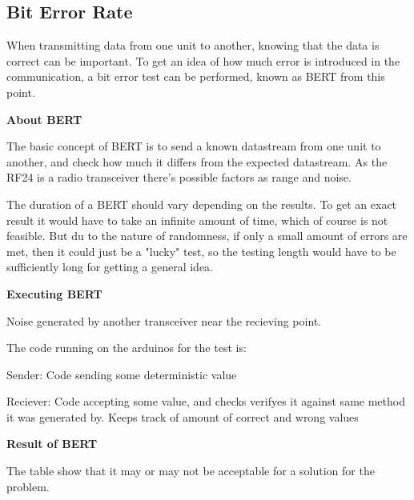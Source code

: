 \subsection{Bit Error Rate}
When transmitting data from one unit to another, knowing that the data is correct can be important. To get an idea of how much error is introduced in the communication, a bit error test can be performed, known as BERT from this point.

\textbf{About BERT}

The basic concept of BERT is to send a known datastream from one unit to another, and check how much it differs from the expected datastream. As the RF24 is a radio transceiver there's possible factors as range and noise. 

The duration of a BERT should vary depending on the results. To get an exact result it would have to take an infinite amount of time, which of course is not feasible. But du to the nature of randomness, if only a small amount of errors are met, then it could just be a "lucky"  test, so the testing length would have to be sufficiently long for getting a general idea.

\textbf{Executing BERT} 

Noise generated by another transceiver near the recieving point.

The code running on the arduinos for the test is:

Sender:
Code sending some deterministic value

Reciever:
Code accepting some value, and checks verifyes it against same method it was generated by.
Keeps track of amount of correct and wrong values

\textbf{Result of BERT}


The table show that it may or may not be acceptable for a solution for the problem.

